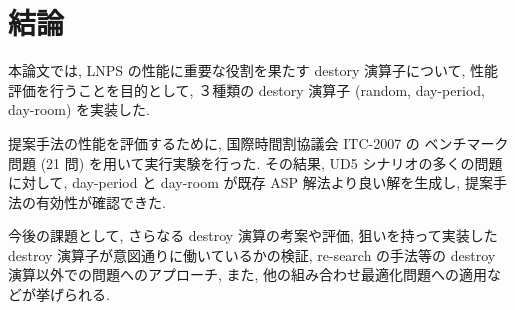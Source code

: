 \chapter{結論}

本論文では, 
LNPS の性能に重要な役割を果たす destory 演算子について, 
性能評価を行うことを目的として, 
３種類の destory 演算子 (random, day-period, day-room) を実装した. 

提案手法の性能を評価するために, 国際時間割協議会 ITC-2007 の
ベンチマーク問題 (21 問) を用いて実行実験を行った. 
その結果, UD5 シナリオの多くの問題に対して, day-period と day-room が既存 ASP 解法より良い解を生成し, 提案手法の有効性が確認できた. 

今後の課題として, さらなる destroy 演算の考案や評価, 
狙いを持って実装した destroy 演算子が意図通りに働いているかの検証, 
re-search の手法等の destroy 演算以外での問題へのアプローチ, 
また, 他の組み合わせ最適化問題への適用などが挙げられる.


